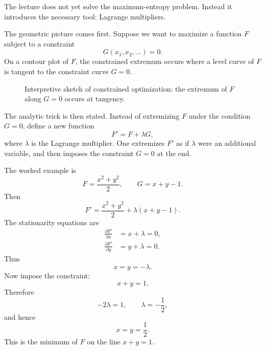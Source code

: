 The lecture does not yet solve the maximum-entropy problem. Instead it introduces the necessary tool: Lagrange multipliers.

The geometric picture comes first. Suppose we want to maximize a function \(F\) subject to a constraint
\begin{equation}
G(x_1,x_2,\dots)=0.
\end{equation}
On a contour plot of \(F\), the constrained extremum occurs where a level curve of \(F\) is tangent to the constraint curve \(G=0\).

\begin{figure}[htbp]
\centering
{}
\caption{Interpretive sketch of constrained optimization: the extremum of \(F\) along \(G=0\) occurs at tangency.}
\end{figure}

The analytic trick is then stated. Instead of extremizing \(F\) under the condition \(G=0\), define a new function
\begin{equation}
F' = F+\lambda G,
\end{equation}
where \(\lambda\) is the Lagrange multiplier. One extremizes \(F'\) as if \(\lambda\) were an additional variable, and then imposes the constraint \(G=0\) at the end.

The worked example is
\begin{equation}
F=\frac{x^2+y^2}{2},
\qquad
G=x+y-1.
\end{equation}
Then
\begin{equation}
F'=\frac{x^2+y^2}{2}+\lambda(x+y-1).
\end{equation}
The stationarity equations are
\begin{align}
\frac{\partial F'}{\partial x} &= x+\lambda = 0, \\
\frac{\partial F'}{\partial y} &= y+\lambda = 0.
\end{align}
Thus
\begin{equation}
x=y=-\lambda.
\end{equation}
Now impose the constraint:
\begin{equation}
x+y=1.
\end{equation}
Therefore
\begin{equation}
-2\lambda=1,
\qquad
\lambda=-\frac12,
\end{equation}
and hence
\begin{equation}
x=y=\frac12.
\end{equation}
This is the minimum of \(F\) on the line \(x+y=1\).

